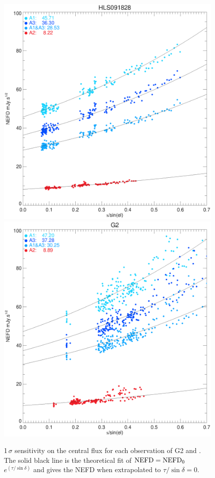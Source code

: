\begin{figure}[!thbp]
\begin{center}
\includegraphics[clip, angle=0, scale =0.42]{Figures/hls_NEFD_vs_TauElev_all.eps}
\includegraphics[clip, angle=0, scale =0.42]{Figures/g2_NEFD_vs_TauElev_all.eps}
\caption[NEFD per scan]{1\,$\sigma$ sensitivity on the central flux for each
  observation of G2 and \hls. The solid black line is the theoretical
  fit of $\rm{NEFD} = \rm{NEFD}_0$ $e^{(\tau/\sin\delta)}$
  and gives the NEFD when extrapolated to $\tau/\sin\delta = 0$.}
\label{fig:nefd_scatter}
\end{center}
\end{figure}

